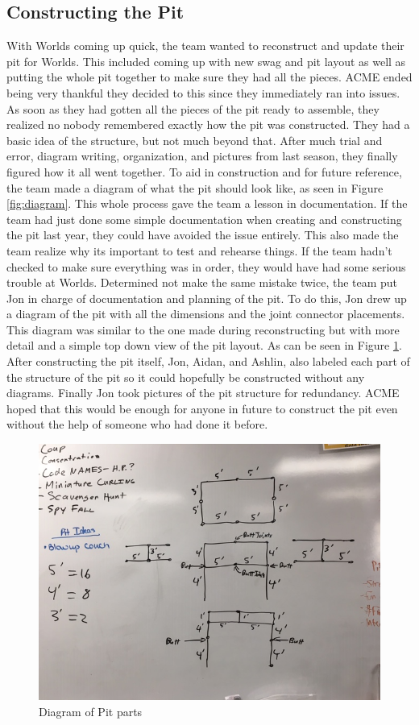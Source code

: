 \documentclass{article}
\begin{document}
\subsection{Constructing the Pit}
With Worlds coming up quick, the team wanted to reconstruct and update their pit for Worlds. This included coming up with new swag and pit layout as well as putting the whole pit together to make sure they had all the pieces. ACME ended being very thankful they decided to this since they immediately ran into issues. As soon as they had gotten all the pieces of the pit ready to assemble, they realized no nobody remembered exactly how the pit was constructed. They had a basic idea of the structure, but not much beyond that. After much trial and error, diagram writing, organization, and pictures from last season, they finally figured how it all went together. To aid in construction and for future reference, the team made a diagram of what the pit should look like, as seen in Figure \ref{fig:diagram}. This whole process gave the team a lesson in documentation. If the team had just done some simple documentation when creating and constructing the pit last year, they could have avoided the issue entirely. This also made the team realize why its important to test and rehearse things. If the team hadn't checked to make sure everything was in order, they would have had some serious trouble at Worlds. Determined not make the same mistake twice, the team put Jon in charge of documentation and planning of the pit. To do this, Jon drew up a diagram of the pit with all the dimensions and the joint connector placements. This diagram was similar to the one made during reconstructing but with more detail and a simple top down view of the pit layout. As can be seen in Figure \ref{fig:pitone}. After constructing the pit itself, Jon, Aidan, and Ashlin, also labeled each part of the structure of the pit so it could hopefully be constructed without any diagrams. Finally Jon took pictures of the pit structure for redundancy. ACME hoped that this would be enough for anyone in future to construct the pit even without the help of someone who had done it before.

\begin{figure}
    \centering
    \includegraphics[width= 0.5 \textwidth]{30_03-25/images/pitdiagram1.JPG}
    \caption{Diagram of Pit parts}
    \label{fig:pitone}
\end{figure}
\end{document}
